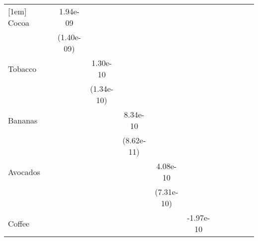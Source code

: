\begin{table}[htbp]
\begin{tabular}{l*{11}{c}}
[1em]
Cocoa       &                     &    1.94e-09         &                     &                     &                     &                     &                     &                     &                     &                     &                     \\
            &                     &  (1.40e-09)         &                     &                     &                     &                     &                     &                     &                     &                     &                     \\
[1em]
Tobacco     &                     &                     &    1.30e-10         &                     &                     &                     &                     &                     &                     &                     &                     \\
            &                     &                     &  (1.34e-10)         &                     &                     &                     &                     &                     &                     &                     &                     \\
[1em]
Bananas     &                     &                     &                     &    8.34e-10\sym{***}&                     &                     &                     &                     &                     &                     &                     \\
            &                     &                     &                     &  (8.62e-11)         &                     &                     &                     &                     &                     &                     &                     \\
[1em]
Avocados    &                     &                     &                     &                     &    4.08e-10         &                     &                     &                     &                     &                     &                     \\
            &                     &                     &                     &                     &  (7.31e-10)         &                     &                     &                     &                     &                     &                     \\
[1em]
Coffee      &                     &                     &                     &                     &                     &   -1.97e-10         &                     &                     &                     &                     &                     \\

\end{tabular}
\end{table}

